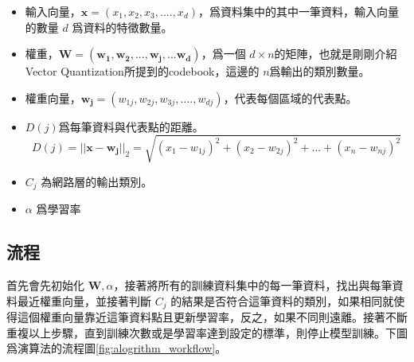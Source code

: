 \begin{itemize}
	\item
	      輸入向量，\(\mathbf{x} = (x_1,x_2,x_3,....,x_d)\)，爲資料集中的其中一筆資料，輸入向量的數量 \(d\) 爲資料的特徵數量。


	\item
	      權重，\(\mathbf{W} = (\mathbf{w_1,w_2,...,w_j,...w_d})\)，爲一個 \(d \times n \)的矩陣，也就是剛剛介紹Vector Quantization所提到的codebook，這邊的 \(n\)爲輸出的類別數量。
	\item
	      權重向量，\(\mathbf{w_{j}} = (w_{1j},w_{2j},w_{3j},....,w_{dj})\)，代表每個區域的代表點。

	\item
	      \(D(j)\)爲每筆資料與代表點的距離。
	      $$D(j)=||\mathbf{x}-\mathbf{w_j}||_2 = \sqrt{(x_1-w_{1j})^2+(x_2-w_{2j})^2+...+(x_n-w_{nj})^2} $$


	\item
	      \(C_j\) 為網路層的輸出類別。

	\item
	      \(\alpha\) 爲學習率

\end{itemize}


\subsection{流程}

首先會先初始化 \(\mathbf{W},\alpha\)，接著將所有的訓練資料集中的每一筆資料，找出與每筆資料最近權重向量，並接著判斷 \(C_j\) 的結果是否符合這筆資料的類別，如果相同就使得這個權重向量靠近這筆資料點且更新學習率，反之，如果不同則遠離。接著不斷重複以上步驟，直到訓練次數或是學習率達到設定的標準，則停止模型訓練。下圖爲演算法的流程圖\ref{fig:alogrithm_workflow}。

\newpage

\usetikzlibrary{positioning, shapes.geometric}



